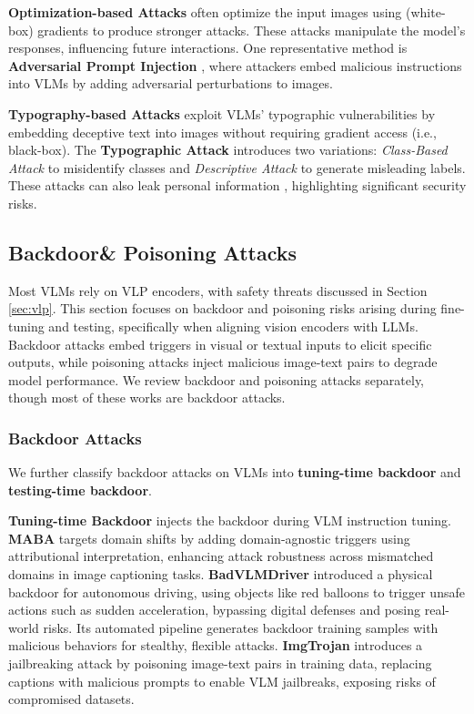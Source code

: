 \textbf{Optimization-based Attacks} often optimize the input images using (white-box) gradients to produce stronger attacks. These attacks manipulate the model's responses, influencing future interactions. One representative method is \textbf{Adversarial Prompt Injection} \cite{bagdasaryan2023ab}, where attackers embed malicious instructions into VLMs by adding adversarial perturbations to images. 

 \textbf{Typography-based Attacks} exploit VLMs' typographic vulnerabilities by embedding deceptive text into images without requiring gradient access (i.e., black-box). The \textbf{Typographic Attack} \cite{qraitem2024vision} introduces two variations: \emph{Class-Based Attack} to misidentify classes and \emph{Descriptive Attack} to generate misleading labels. These attacks can also leak personal information \cite{chen2023can}, highlighting significant security risks.

\subsection{Backdoor\& Poisoning Attacks}
\label{sec:vlm-backdoor}
Most VLMs rely on VLP encoders, with safety threats discussed in Section \ref{sec:vlp}. This section focuses on backdoor and poisoning risks arising during fine-tuning and testing, specifically when aligning vision encoders with LLMs. 
Backdoor attacks embed triggers in visual or textual inputs to elicit specific outputs, while poisoning attacks inject malicious image-text pairs to degrade model performance.
We review backdoor and poisoning attacks separately, though most of these works are backdoor attacks.

\subsubsection{Backdoor Attacks}
We further classify backdoor attacks on VLMs into \textbf{tuning-time backdoor} and \textbf{testing-time backdoor}.

\textbf{Tuning-time Backdoor} injects the backdoor during VLM instruction tuning. \textbf{MABA} \cite{liang2024revisiting} targets domain shifts by adding domain-agnostic triggers using attributional interpretation, enhancing attack robustness across mismatched domains in image captioning tasks.
\textbf{BadVLMDriver} \cite{ni2024physical} introduced a physical backdoor for autonomous driving, using objects like red balloons to trigger unsafe actions such as sudden acceleration, bypassing digital defenses and posing real-world risks. Its automated pipeline generates backdoor training samples with malicious behaviors for stealthy, flexible attacks. \textbf{ImgTrojan} \cite{tao2024imgtrojan} introduces a jailbreaking attack by poisoning image-text pairs in training data, replacing captions with malicious prompts to enable VLM jailbreaks, exposing risks of compromised datasets. 

